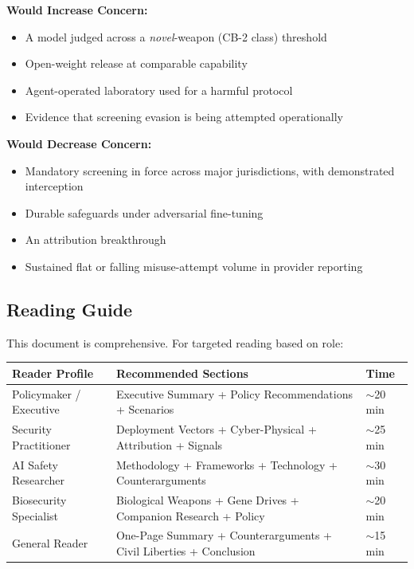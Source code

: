 \documentclass[11pt,letterpaper]{article}
\begin{document}
\begin{minipage}[t]{0.48\textwidth}
\textbf{Would Increase Concern:}
\begin{itemize}[nosep]
  \item A model judged across a \textit{novel}-weapon (CB-2 class) threshold
  \item Open-weight release at comparable capability
  \item Agent-operated laboratory used for a harmful protocol
  \item Evidence that screening evasion is being attempted operationally
\end{itemize}
\end{minipage}
\hfill
\begin{minipage}[t]{0.48\textwidth}
\textbf{Would Decrease Concern:}
\begin{itemize}[nosep]
  \item Mandatory screening in force across major jurisdictions, with demonstrated interception
  \item Durable safeguards under adversarial fine-tuning
  \item An attribution breakthrough
  \item Sustained flat or falling misuse-attempt volume in provider reporting
\end{itemize}
\end{minipage}

\subsection*{Reading Guide}

This document is comprehensive. For targeted reading based on role:

\begin{center}
\small
\begin{tabular}{L{3.5cm}L{7cm}L{1.5cm}}
\toprule
\textbf{Reader Profile} & \textbf{Recommended Sections} & \textbf{Time} \\
\midrule
Policymaker / Executive & Executive Summary + Policy Recommendations + Scenarios & $\sim$20 min \\
Security Practitioner & Deployment Vectors + Cyber-Physical + Attribution + Signals & $\sim$25 min \\
AI Safety Researcher & Methodology + Frameworks + Technology + Counterarguments & $\sim$30 min \\
Biosecurity Specialist & Biological Weapons + Gene Drives + Companion Research + Policy & $\sim$20 min \\
General Reader & One-Page Summary + Counterarguments + Civil Liberties + Conclusion & $\sim$15 min \\
\bottomrule
\end{tabular}
\end{center}
\end{document}
